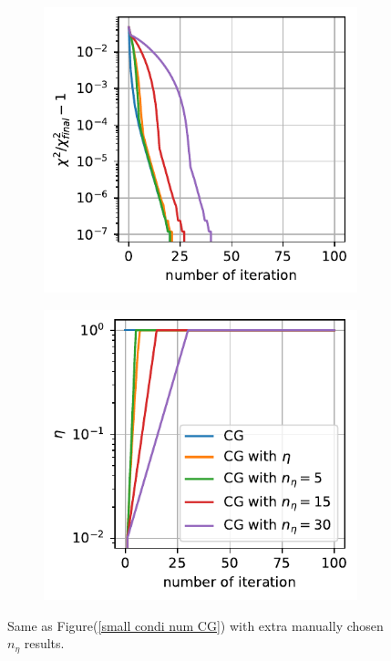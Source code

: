 \documentclass[11pt, letterpaper]{article}
\begin{document}
\begin{figure}[htb]
\begin{subfigure}{0.33\textwidth}
    \includegraphics[width=\linewidth]
        {./images/0.1/small_condition_num/chi2.pdf}
    \caption{}
    \label{small condi num chi2}
\end{subfigure}%
\begin{subfigure}{0.33\textwidth}
    \centering
    \includegraphics[width=\linewidth]
        {./images/0.1/small_condition_num/eta.pdf}
    \caption{}
    \label{small condi num eta}
\end{subfigure}
\caption{Same as Figure(\ref{small condi num CG}) with extra manually chosen 
    $n_{\eta}$ results.
}
\label{small condi num}
\end{figure}
\end{document}
